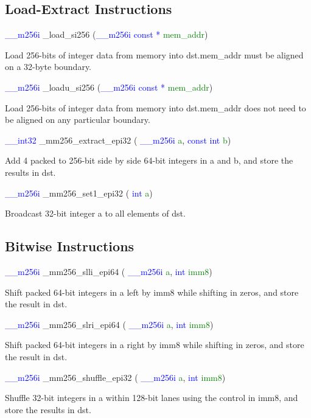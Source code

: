 \documentclass[11pt,oneside,a4paper]{article}
\begin{document}
\subsection{Load-Extract Instructions}
\textcolor{blue}{\_\_m256i} \_load\_si256 (\textcolor{blue}{\_\_m256i const *} \textcolor{green}{mem\_addr})
\par Load 256-bits of integer data from memory into dst.mem\_addr must be aligned on a 32-byte boundary.
\par
\textcolor{blue}{\_\_m256i} \_loadu\_si256 (\textcolor{blue}{\_\_m256i const *} \textcolor{green}{mem\_addr})
\par Load 256-bits of integer data from memory into dst.mem\_addr does not need to be aligned on any particular boundary.
\par
\textcolor{blue}{ \_\_int32} \_mm256\_extract\_epi32 ( \textcolor{blue}{ \_\_m256i} \textcolor{green}{a}, \textcolor{blue}{const int} \textcolor{green}{b})
\par Add 4 packed to 256-bit side by side 64-bit integers in a and b, and store the results in dst.
\par
\textcolor{blue}{ \_\_m256i} \_mm256\_set1\_epi32 ( \textcolor{blue}{ int} \textcolor{green}{a})
\par Broadcast 32-bit integer a to all elements of dst.
\par 
\subsection{Bitwise Instructions}
\textcolor{blue}{ \_\_m256i} \_mm256\_slli\_epi64 ( \textcolor{blue}{ \_\_m256i} \textcolor{green}{a}, \textcolor{blue}{int} \textcolor{green}{imm8})
\par Shift packed 64-bit integers in a left by imm8 while shifting in zeros, and store the result in dst.
\par
\textcolor{blue}{ \_\_m256i} \_mm256\_slri\_epi64 ( \textcolor{blue}{ \_\_m256i} \textcolor{green}{a}, \textcolor{blue}{int} \textcolor{green}{imm8})
\par Shift packed 64-bit integers in a right by imm8 while shifting in zeros, and store the result in dst.
\par
\textcolor{blue}{ \_\_m256i} \_mm256\_shuffle\_epi32 ( \textcolor{blue}{ \_\_m256i} \textcolor{green}{a}, \textcolor{blue}{int} \textcolor{green}{imm8})
\par Shuffle 32-bit integers in a within 128-bit lanes using the control in imm8, and store the results in dst.
\end{document}
